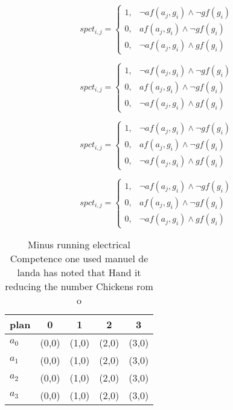 \documentclass[a4paper]{article}
\begin{document}
\begin{equation}
spct_{i,j} =
\begin{cases}
1, & \text{$\neg af(a_j,g_i) \wedge \neg gf(g_i)$}\\
0, & \text{$af(a_j,g_i) \wedge \neg gf(g_i)$}\\
0, & \text{$\neg af(a_j,g_i) \wedge gf(g_i)$}
\end{cases}
\end{equation}

\begin{equation}
spct_{i,j} =
\begin{cases}
1, & \text{$\neg af(a_j,g_i) \wedge \neg gf(g_i)$}\\
0, & \text{$af(a_j,g_i) \wedge \neg gf(g_i)$}\\
0, & \text{$\neg af(a_j,g_i) \wedge gf(g_i)$}
\end{cases}
\end{equation}

\begin{equation}
spct_{i,j} =
\begin{cases}
1, & \text{$\neg af(a_j,g_i) \wedge \neg gf(g_i)$}\\
0, & \text{$af(a_j,g_i) \wedge \neg gf(g_i)$}\\
0, & \text{$\neg af(a_j,g_i) \wedge gf(g_i)$}
\end{cases}
\end{equation}

\begin{equation}
spct_{i,j} =
\begin{cases}
1, & \text{$\neg af(a_j,g_i) \wedge \neg gf(g_i)$}\\
0, & \text{$af(a_j,g_i) \wedge \neg gf(g_i)$}\\
0, & \text{$\neg af(a_j,g_i) \wedge gf(g_i)$}
\end{cases}
\end{equation}

\begin{table}
\begin{adjustbox}{width=0.7\columnwidth}
\begin{tabular}{|l|l|l|l|l|}
\hline
\textbf{plan} & \multicolumn{1}{c|}{\textbf{0}} & \multicolumn{1}{c|}{\textbf{1}} & \multicolumn{1}{c|}{\textbf{2}} & \multicolumn{1}{c|}{\textbf{3}} \\ \hline
\textbf{$a_0$}  & (0,0) & (1,0) & (2,0) & (3,0) \\ \hline
\textbf{$a_1$}  & (0,0) & (1,0) & (2,0) & (3,0) \\ \hline
\textbf{$a_2$}  & (0,0) & (1,0) & (2,0) & (3,0) \\ \hline
\textbf{$a_3$}  & (0,0) & (1,0) & (2,0) & (3,0) \\ \hline
\end{tabular}
\end{adjustbox}
\caption{Minus running electrical Competence one used manuel de landa has noted that Hand it reducing the number Chickens rom o 
}
\end{table}
\end{document}
